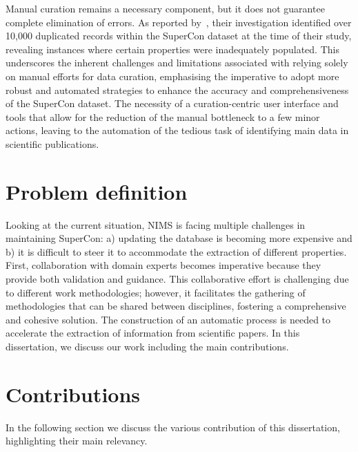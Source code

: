 Manual curation remains a necessary component, but it does not guarantee complete elimination of errors. As reported by~\cite{sommer20223dsc}, their investigation identified over 10,000 duplicated records within the SuperCon dataset at the time of their study, revealing instances where certain properties were inadequately populated. 
This underscores the inherent challenges and limitations associated with relying solely on manual efforts for data curation, emphasising the imperative to adopt more robust and automated strategies to enhance the accuracy and comprehensiveness of the SuperCon dataset.
The necessity of a curation-centric user interface and tools that allow for the reduction of the manual bottleneck to a few minor actions, leaving to the automation of the tedious task of identifying main data in scientific publications.


\section{Problem definition}

Looking at the current situation, NIMS is facing multiple challenges in maintaining SuperCon: a) updating the database is becoming more expensive and b) it is difficult to steer it to accommodate the extraction of different properties. 
First, collaboration with domain experts becomes imperative because they provide both validation and guidance. 
This collaborative effort is challenging due to different work methodologies; however, it facilitates the gathering of methodologies that can be shared between disciplines, fostering a comprehensive and cohesive solution.
The construction of an automatic process is needed to accelerate the extraction of information from scientific papers. In this dissertation, we discuss our work including the main contributions. 

\section{Contributions}
In the following section we discuss the various contribution of this dissertation, highlighting their main relevancy. 

